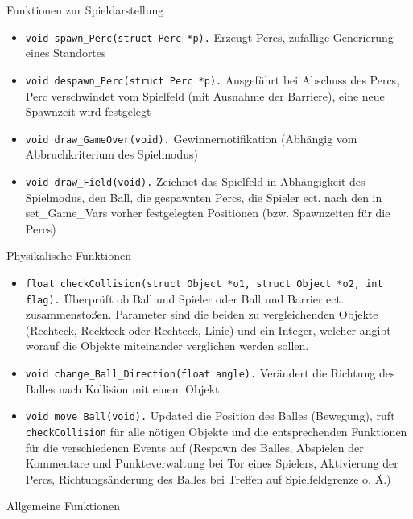 \documentclass[a4paper, 10pt]{article}
\begin{document}
\medskip
Funktionen zur Spieldarstellung
\begin{itemize}
\item \texttt{void spawn\_Perc(struct Perc *p).} Erzeugt Percs, zufällige Generierung eines Standortes
\item \texttt{void despawn\_Perc(struct Perc *p).} Ausgeführt bei Abschuss des Percs, Perc verschwindet vom Spielfeld (mit Ausnahme der Barriere), eine neue Spawnzeit wird festgelegt
\item \texttt{void draw\_GameOver(void).} Gewinnernotifikation (Abhängig vom Abbruchkriterium des Spielmodus)
\item \texttt{void draw\_Field(void).} Zeichnet das Spielfeld in Abhängigkeit des Spielmodus, den Ball, die gespawnten Percs, die Spieler ect. nach den in set\_Game\_Vars vorher festgelegten Positionen (bzw. Spawnzeiten für die Percs)
\end{itemize}
\medskip
Physikalische Funktionen
\begin{itemize}
\item \texttt{float checkCollision(struct Object *o1, struct Object *o2, int flag).} Überprüft ob Ball und Spieler oder Ball und Barrier ect. zusammenstoßen. Parameter sind die beiden zu vergleichenden Objekte (Rechteck, Reckteck oder Rechteck, Linie) und ein Integer, welcher angibt worauf die Objekte miteinander verglichen werden sollen.
\item \texttt{void change\_Ball\_Direction(float angle).} Verändert die Richtung des Balles nach Kollision mit einem Objekt
\item \texttt{void move\_Ball(void).} Updated die Position des Balles (Bewegung), ruft \texttt{checkCollision} für alle nötigen Objekte und die entsprechenden Funktionen für die verschiedenen Events auf (Respawn des Balles, Abspielen der Kommentare und Punkteverwaltung bei Tor eines Spielers, Aktivierung der Percs, Richtungsänderung des Balles bei Treffen auf Spielfeldgrenze o. Ä.)
\end{itemize}
\medskip
Allgemeine Funktionen
\end{document}
